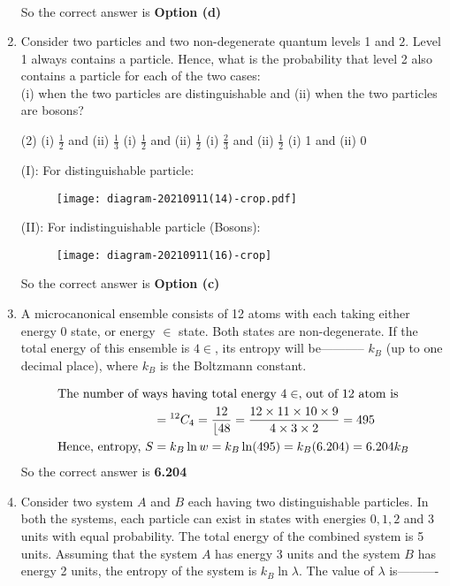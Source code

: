 \begin{enumerate}
\begin{answer}
\begin{align*}
		\end{align*}
		So the correct answer is \textbf{Option (d)}
	\end{answer}
	\item Consider two particles and two non-degenerate quantum levels 1 and $2 .$ Level 1 always contains a particle. Hence, what is the probability that level 2 also contains a particle for each of the two cases:\\
	(i) when the two particles are distinguishable and (ii) when the two particles are bosons?
	{}
	\begin{tasks}(2)
		\task[\textbf{a.}] (i) $\frac{1}{2}$ and (ii) $\frac{1}{3}$
		\task[\textbf{b.}] (i) $\frac{1}{2}$ and (ii) $\frac{1}{2}$
		\task[\textbf{c.}] (i) $\frac{2}{3}$ and (ii) $\frac{1}{2}$
		\task[\textbf{d.}] (i) 1 and (ii) 0
	\end{tasks}
\begin{answer}
	(I): For distinguishable particle:\\\begin{figure}[H]
		\centering
		\texttt{[image: diagram-20210911(14)-crop.pdf]}
	\end{figure}
	(II): For indistinguishable particle (Bosons):\\
	\begin{figure}[H]
		\centering
		\texttt{[image: diagram-20210911(16)-crop]}
	\end{figure}
	So the correct answer is \textbf{Option (c)}
\end{answer}
	\item A microcanonical ensemble consists of 12 atoms with each taking either energy 0 state, or energy $\in$ state. Both states are non-degenerate. If the total energy of this ensemble is $4 \in$, its entropy will be----------- $k_{B}$ (up to one decimal place), where $k_{B}$ is the Boltzmann constant.
	{}
	\begin{answer}
		\begin{align*}
		\intertext{The number of ways having total energy $4 \in$, out of 12 atom is}
		&={ }^{12} C_{4}=\frac{12}{\lfloor 48}=\frac{12 \times 11 \times 10 \times 9}{4 \times 3 \times 2}=495\\
		\text{Hence, entropy, }S&=k_{B} \ln w=k_{B} \ln (495)=k_{B}(6.204)=6.204 k_{B}
		\end{align*}
		So the correct answer is \textbf{6.204}
	\end{answer}
	\item Consider two system $A$ and $B$ each having two distinguishable particles. In both the systems, each particle can exist in states with energies $0,1,2$ and 3 units with equal probability. The total energy of the combined system is 5 units. Assuming that the system $A$ has energy 3 units and the system $B$ has energy 2 units, the entropy of the system is $k_{B} \ln \lambda$. The value of $\lambda$ is----------

\end{enumerate}

